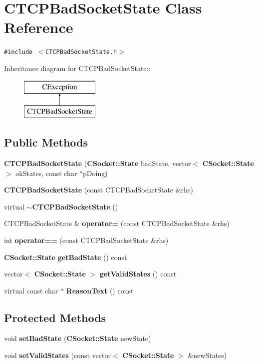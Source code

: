 \section{CTCPBad\-Socket\-State  Class Reference}
\label{classCTCPBadSocketState}
{\tt \#include $<$CTCPBad\-Socket\-State.h$>$}

Inheritance diagram for CTCPBad\-Socket\-State::\begin{figure}[H]
\begin{center}
\leavevmode
\includegraphics[height=2cm]{classCTCPBadSocketState}
\end{center}
\end{figure}
\subsection*{Public Methods}
\begin{CompactItemize}
\item 
{\bf CTCPBad\-Socket\-State} ({\bf CSocket::State} bad\-State, vector$<$ {\bf CSocket::State} $>$ ok\-States, const char $\ast$p\-Doing)
\item 
{\bf CTCPBad\-Socket\-State} (const CTCPBad\-Socket\-State \&rhs)
\item 
virtual {\bf $\sim$CTCPBad\-Socket\-State} ()
\item 
CTCPBad\-Socket\-State \& {\bf operator=} (const CTCPBad\-Socket\-State \&rhs)
\item 
int {\bf operator==} (const CTCPBad\-Socket\-State \&rhs)
\item 
{\bf CSocket::State} {\bf get\-Bad\-State} () const
\item 
vector$<$ {\bf CSocket::State} $>$ {\bf get\-Valid\-States} () const
\item 
virtual const char $\ast$ {\bf Reason\-Text} () const
\end{CompactItemize}
\subsection*{Protected Methods}
\begin{CompactItemize}
\item 
void {\bf set\-Bad\-State} ({\bf CSocket::State} new\-State)
\item 
void {\bf set\-Valid\-States} (const vector$<$ {\bf CSocket::State} $>$ \&new\-States)
\end{CompactItemize}
